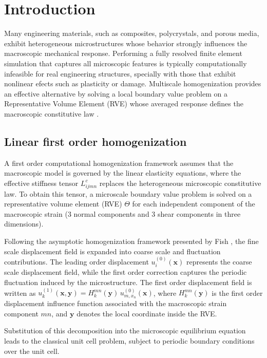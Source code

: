 \documentclass[12pt]{article}
\begin{document}
\section{Introduction}
Many engineering materials, such as composites, polycrystals, and porous media, exhibit heterogeneous microstructures whose behavior strongly influences the macroscopic mechanical response. Performing a fully resolved finite element simulation that captures all microscopic features is typically computationally infeasible for real engineering structures, specially with those that exhibit nonlinear efects such as plasticity or damage. Multiscale homogenization provides an effective alternative by solving a local boundary value problem on a Representative Volume Element (RVE) whose averaged response defines the macroscopic constitutive law \cite{Fish2013,FishCuiEBH,Geers2010}.

\subsection{Linear first order homogenization}

A first order computational homogenization framework assumes that the macroscopic model is governed by the linear elasticity equations, where the effective stiffness tensor $L^c_{ijmn}$ replaces the heterogeneous microscopic constitutive law. To obtain this tensor, a microscale boundary value problem is solved on a representative volume element (RVE) $\Theta$ for each independent component of the macroscopic strain (3 normal components and 3 shear components in three dimensions).

Following the asymptotic homogenization framework presented by Fish \cite{Fish2013}, the fine scale displacement field is expanded into coarse scale and fluctuation contributions. The leading order displacement $u_i^{(0)}(\mathbf{x})$ represents the coarse scale displacement field, while the first order correction captures the periodic fluctuation induced by the microstructure. The first order displacement field is written as $u_k^{(1)}(\mathbf{x},\mathbf{y}) = H_k^{mn}(\mathbf{y})\,u^{(0)}_{m,x_n}(\mathbf{x})$, where $H_k^{mn}(\mathbf{y})$ is the first order displacement influence function associated with the macroscopic strain component $mn$, and $\mathbf{y}$ denotes the local coordinate inside the RVE.

Substitution of this decomposition into the microscopic equilibrium equation leads to the classical unit cell problem, subject to periodic boundary conditions over the unit cell.
\end{document}
